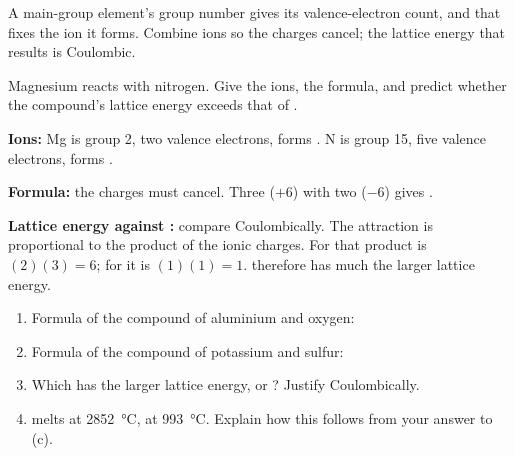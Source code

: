 \documentclass{apchem-worksheet}
\begin{document}
A main-group element's group number gives its valence-electron count, and
that fixes the ion it forms. Combine ions so the charges cancel; the
lattice energy that results is Coulombic.

\begin{workedexample}
Magnesium reacts with nitrogen. Give the ions, the formula, and predict
whether the compound's lattice energy exceeds that of .

\textbf{Ions:} Mg is group 2, two valence electrons, forms .
N is group 15, five valence electrons, forms .

\textbf{Formula:} the charges must cancel. Three  ($+6$) with
two  ($-6$) gives \textbf{}.

\textbf{Lattice energy against :} compare Coulombically. The
attraction is proportional to the product of the ionic charges. For
 that product is $(2)(3) = 6$; for  it is
$(1)(1) = 1$.  therefore has much the larger lattice energy.
\end{workedexample}

\begin{yourturn}
\begin{enumerate}[leftmargin=*,itemsep=0.5em]
  \item Formula of the compound of aluminium and oxygen:
        \workspace[1.4cm]
  \item Formula of the compound of potassium and sulfur:
        \workspace[1.4cm]
  \item Which has the larger lattice energy,  or ?
        Justify Coulombically. \workspace[2.4cm]
  \item {} melts at \SI{2852}{\celsius},  at
        \SI{993}{\celsius}. Explain how this follows from your answer to
        (c). \workspace[2.0cm]
\end{enumerate}
\end{yourturn}
\end{document}
